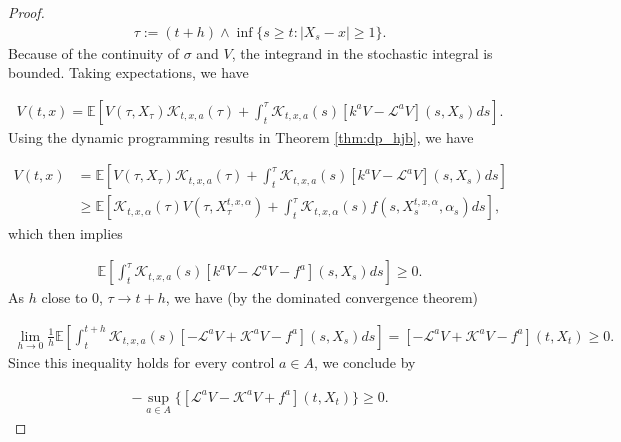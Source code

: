 \documentclass{article}
\begin{document}
\begin{proof}
\begin{equation} \label{stp_time_hjb}
\begin{aligned}
\tau:=(t+h)\wedge\inf\{s\geq t:|X_s-x|\geq1\}.
\end{aligned}
\end{equation}
Because of the continuity of $\sigma$ and $V$, the integrand in the stochastic integral is bounded. Taking expectations, we have

\begin{equation*}
\begin{aligned}
V(t,x)=\mathbb{E}\left[V(\tau,X_\tau)\mathcal{K}_{t,x,a}(\tau)+\int^\tau_t\mathcal{K}_{t,x,a}(s)[k^aV-\mathcal{L}^aV](s,X_s)ds\right].
\end{aligned}
\end{equation*}
Using the dynamic programming results in Theorem \ref{thm:dp_hjb}, we have 

\begin{equation*}
\begin{aligned}
V(t,x)&=\mathbb{E}\left[V(\tau,X_\tau)\mathcal{K}_{t,x,a}(\tau)+\int^\tau_t\mathcal{K}_{t,x,a}(s)[k^aV-\mathcal{L}^aV](s,X_s)ds\right]\\
&\geq\mathbb{E}\left[\mathcal{K}_{t,x,\alpha}(\tau)V(\tau,X_\tau^{t,x,\alpha})+\int^\tau_t\mathcal{K}_{t,x,\alpha}(s)f(s,X_s^{t,x,\alpha},\alpha_s)ds\right],
\end{aligned}
\end{equation*}
which then implies

\begin{equation*}
\begin{aligned}
\mathbb{E}\left[\int^\tau_t\mathcal{K}_{t,x,a}(s)[k^aV-\mathcal{L}^aV-f^a](s,X_s)ds\right]\geq0.
\end{aligned}
\end{equation*}
As $h$ close to $0$, $\tau\rightarrow t+h$, we have (by the dominated convergence theorem)

\begin{equation*}
\begin{aligned}
\lim_{h\rightarrow0}\frac{1}{h}\mathbb{E}\left[\int^{t+h}_t\mathcal{K}_{t,x,a}(s)[-\mathcal{L}^aV+\mathcal{K}^aV-f^a](s,X_s)ds\right]=[-\mathcal{L}^aV+\mathcal{K}^aV-f^a](t,X_t)\geq0.
\end{aligned}
\end{equation*}
Since this inequality holds for every control $a\in A$, we conclude by 

\begin{equation*}
\begin{aligned}
-\sup_{a\in A}\{[\mathcal{L}^aV-\mathcal{K}^aV+f^a](t,X_t)\}\geq0.
\end{aligned}
\end{equation*}


\end{proof}
\end{document}

